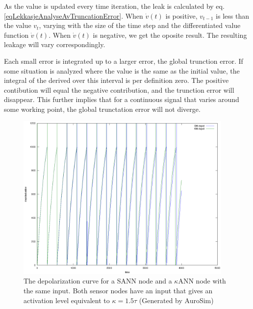 As the value is updated every time iteration, the leak is calculated by eq. \ref{eqLekkasjeAnalyseAvTruncationError}.
When $\dot{v}(t)$ is positive, $v_{t-1}$ is less than the value $v_t$, varying with the size of the time step and the differentiated value function $\dot{v}(t)$.
When $\dot{v}(t)$ is negative, we get the oposite result.
The resulting leakage will vary correspondingly.

Each small error is integrated up to a larger error, the global trunction error. 
If some situation is analyzed where the value is the same as the initial value, the integral of the derived over this interval is per definition zero.
The positive contibution will equal the negative contribution, and the trunction error will disappear.
This further implies that for a continuous signal that varies around some working point, the global trunctation error will not diverge. 

\begin{figure}[hbt!]
	\centering
		\includegraphics[width=0.95\textwidth]{eps_comparison_between_KN_and_SN_ConstKappa}
	\caption{The depolarization curve for a SANN node and a $\kappa$ANN node with the same input. Both sensor nodes have an input that gives an activation level equivalent to $\kappa = 1.5 \tau$ 
			(Generated by AuroSim)} %
	\label{figComparisonBetweenSsensorAndKsensorDepolCurveCONStActivityLevel}
\end{figure}

